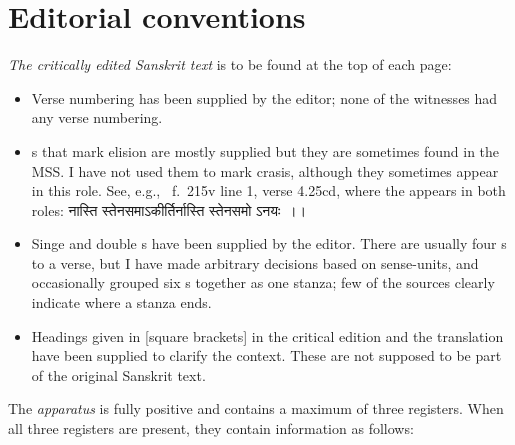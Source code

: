 
\section{Editorial conventions}
\label{editorial}
\bigskip


\textit{The critically edited Sanskrit text} is to be found at the top of each page:

\begin{itemize}



\item Verse numbering has been supplied by the editor; none of the witnesses had any verse numbering.
\item {}s that mark elision are mostly supplied but they are sometimes found in the MSS.
      I have not used them to mark crasis, although they sometimes appear in this role.
        See, e.g., \msKOb\ f.~\thinspace 215v line 1, verse 4.25cd, where the  
        appears in both roles: {\devanagarifont नास्ति स्तेनसमाऽकीर्तिर्नास्ति स्तेनसमो ऽनयः~।।}
\item Singe and double s have been supplied by the editor.
        There are usually four s to a verse, but I have made arbitrary decisions
        based on sense-units, and occasionally grouped six s together as one stanza;
        few of the sources clearly indicate where a stanza ends.

\item  Headings given in [square brackets] in the critical edition and the translation 
        have been supplied to clarify the context. 
        These are not supposed to be part of the original Sanskrit text.
\end{itemize}

\bigskip
\noindent
The \textit{apparatus} is fully positive and contains a maximum of three registers. 
When all three registers are present, they contain information as follows:


